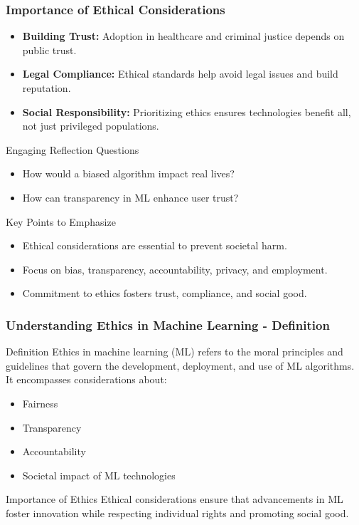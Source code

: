 \documentclass[aspectratio=169]{beamer}
\begin{document}
\begin{frame}[fragile]
    \frametitle{Importance of Ethical Considerations}
    \begin{itemize}
        \item \textbf{Building Trust:} Adoption in healthcare and criminal justice depends on public trust.
        \item \textbf{Legal Compliance:} Ethical standards help avoid legal issues and build reputation.
        \item \textbf{Social Responsibility:} Prioritizing ethics ensures technologies benefit all, not just privileged populations.
    \end{itemize}
    
    \begin{block}{Engaging Reflection Questions}
        \begin{itemize}
            \item How would a biased algorithm impact real lives?
            \item How can transparency in ML enhance user trust?
        \end{itemize}
    \end{block}
    
    \begin{block}{Key Points to Emphasize}
        \begin{itemize}
            \item Ethical considerations are essential to prevent societal harm.
            \item Focus on bias, transparency, accountability, privacy, and employment.
            \item Commitment to ethics fosters trust, compliance, and social good.
        \end{itemize}
    \end{block}
\end{frame}

\begin{frame}[fragile]
    \frametitle{Understanding Ethics in Machine Learning - Definition}
    \begin{block}{Definition}
        Ethics in machine learning (ML) refers to the moral principles and guidelines that govern the development, deployment, and use of ML algorithms. It encompasses considerations about:
        \begin{itemize}
            \item Fairness
            \item Transparency
            \item Accountability
            \item Societal impact of ML technologies
        \end{itemize}
    \end{block}
    \begin{block}{Importance of Ethics}
        Ethical considerations ensure that advancements in ML foster innovation while respecting individual rights and promoting social good.
    \end{block}
\end{frame}
\end{document}
